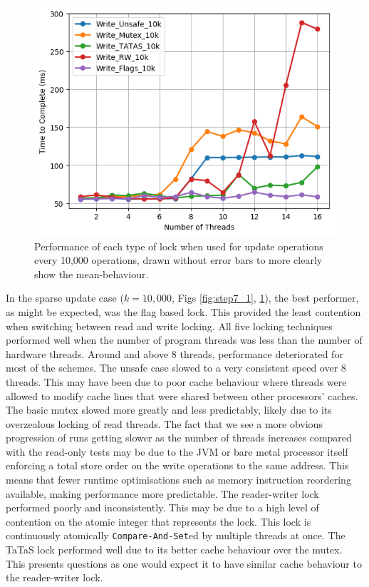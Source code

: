 \documentclass[11pt]{article}
\begin{document}
\begin{figure}
\centering
\includegraphics[scale=0.65]{step7_2.png}
\caption{Performance of each type of lock when used for update operations every 10,000 operations, drawn without error bars to more clearly show the mean-behaviour.}
\label{fig:step7_2}
\end{figure}



In the sparse update case ($k = 10,000$, Figs \ref{fig:step7_1}, \ref{fig:step7_2}), the best performer, as might be expected, was the flag based lock. This provided the least contention when switching between read and write locking. All five locking techniques performed well when the number of program threads was less than the number of hardware threads. Around and above 8 threads, performance deteriorated for most of the schemes. The unsafe case slowed to a very consistent speed over 8 threads. This may have been due to poor cache behaviour where threads were allowed to modify cache lines that were shared between other processors' caches. The basic mutex slowed more greatly and less predictably, likely due to its overzealous locking of read threads. The fact that we see a more obvious progression of runs getting slower as the number of threads increases compared with the read-only tests may be due to the JVM or bare metal processor itself enforcing a total store order on the write operations to the same address. This means that fewer runtime optimisations such as memory instruction reordering available, making performance more predictable. The reader-writer lock performed poorly and inconsistently. This may be due to a high level of contention on the atomic integer that represents the lock. This lock is continuously atomically \texttt{Compare-And-Set}ed by multiple threads at once. The TaTaS lock performed well due to its better cache behaviour over the mutex. This presents questions as one would expect it to have similar cache behaviour to the reader-writer lock.
\end{document}
